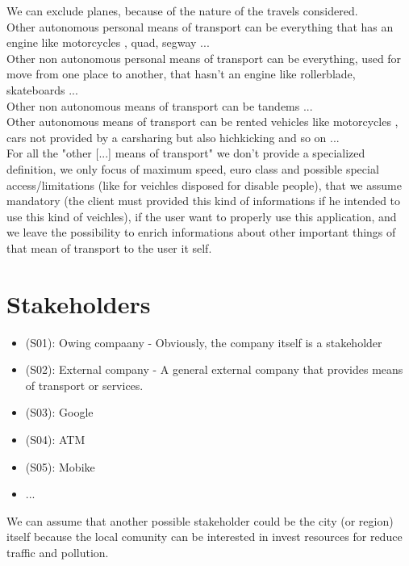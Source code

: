 \documentclass[a4paper]{book}
\begin{document}
We can exclude planes, because of the nature of the travels considered.\\

Other autonomous personal means of transport can be everything that has an engine like motorcycles , quad, segway ...\\

Other non autonomous personal means of transport can be everything, used for move from one place to another, that hasn't an engine like rollerblade, skateboards ...\\

Other non autonomous means of transport can be tandems ... \\

Other autonomous means of transport can be rented vehicles like motorcycles , cars not provided by a carsharing but also hichkicking and so on ... \\

For all the "other [...] means of transport" we don't provide a specialized definition, we only focus of maximum speed, euro class and possible special access/limitations (like for veichles disposed for disable people), that we assume mandatory (the client must provided this kind of informations if he intended to use this kind of veichles), if the user want to properly use this application, and we leave the possibility to enrich informations about other important things of that mean of transport to the user it self.\\ 


\section{Stakeholders}
\begin{itemize}

\item (S01): Owing compaany - Obviously, the company itself is a stakeholder
\item (S02): External company - A general external company that provides means of transport or services.
\item (S03): Google
\item (S04): ATM
\item (S05): Mobike 
\item ...

\end{itemize}

We can assume that another possible stakeholder could be the city (or region) itself because the local comunity can be interested in invest resources for reduce traffic and pollution.\\
\end{document}
